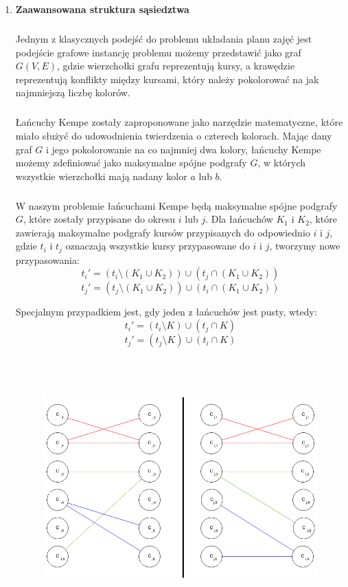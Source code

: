 \begin{enumerate}
\begin{table}[H]
\caption {Plan po wykonaniu przykładowej zamiany}
\end{table} 

\item \textbf{Zaawansowana struktura sąsiedztwa} 
\subparagraph{}
Jednym z klasycznych podejść do problemu układania planu zajęć jest podejście grafowe instancję problemu możemy przedstawić jako graf $G(V, E)$, gdzie wierzchołki grafu reprezentują kursy, a krawędzie reprezentują konflikty między kursami, który należy pokolorować na jak najmniejszą liczbę kolorów. 
\subparagraph{}Łańcuchy Kempe zostały zaproponowane jako narzędzie matematyczne, które miało służyć do udowodnienia twierdzenia o czterech kolorach. Mając dany graf $G$ i jego pokolorowanie na co najmniej dwa kolory, łańcuchy Kempe możemy zdefiniować jako maksymalne spójne podgrafy $G$, w których wszystkie wierzchołki mają nadany kolor $a$ lub $b$.
\subparagraph{}W naszym problemie łańcuchami Kempe będą maksymalne spójne podgrafy $G$, które zostały przypisane do okresu $i$ lub $j$. Dla łańcuchów $K_1$ i $K_2$, które zawierają maksymalne podgrafy kursów przypisanych do odpowiednio $i$ i $j$, gdzie $t_i$ i $t_j$ oznaczają wszystkie kursy przypasowane do $i$ i $j$, tworzymy nowe przypasowania:
\[ t_i' = (t_i \setminus  (K_1 \cup K_2)) \cup (t_j \cap (K_1 \cup K_2)) \]
\[ t_j' = (t_j \setminus  (K_1 \cup K_2)) \cup (t_i \cap (K_1 \cup K_2)) \]

Specjalnym przypadkiem jest, gdy jeden z łańcuchów jest pusty, wtedy:
\[ t_i' = (t_i \setminus K) \cup (t_j \cap K)\]
\[ t_j' = (t_j \setminus K) \cup (t_i \cap K)\]



\begin{figure}[H]

\includegraphics[height=10cm]{kempeSwap.png}\hfill
\centering


\end{figure}
\end{enumerate}

